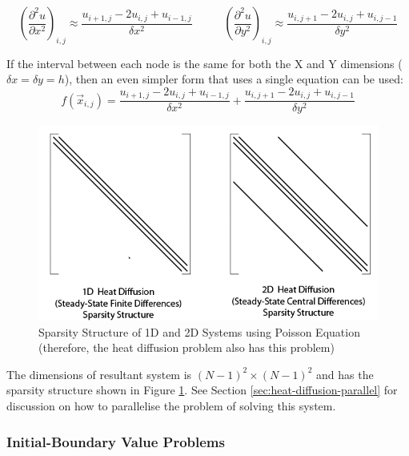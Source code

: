 \documentclass{article}
\begin{document}
\begin{equation}
	{\left( \frac{\partial^2 u}{\partial x^2} \right)}_{i,j} \approx \frac{u_{i + 1,j} - 2u_{i,j} + u_{i - 1,j} }{\delta x^2}
	\;\;\;\;\;\;\;\;\;\;
	{\left( \frac{\partial^2 u}{\partial y^2} \right)}_{i,j} \approx \frac{u_{i,j+1} - 2u_{i,j} + u_{i,j-1} }{\delta y^2}
	\label{eq:poisson-2d-approx}
\end{equation}

If the interval between each node is the same for both the X and Y dimensions ($\delta x = \delta y = h$), then an even simpler form that uses a single equation can be used:
\begin{equation}
	f(\vec{x}_{i,j}) = \frac{u_{i + 1,j} - 2u_{i,j} + u_{i - 1,j} }{\delta x^2} + \frac{u_{i,j+1} - 2u_{i,j} + u_{i,j-1} }{\delta y^2}
	\label{eq:poisson-2d-approx-uniform}
\end{equation}

\begin{figure}
	\centering
	\includegraphics[scale=0.35]{figures/heat-diffusion-sparsity-structures.png}
	\caption{Sparsity Structure of 1D and 2D Systems using Poisson Equation (therefore, the heat diffusion problem also has this problem)}
	\label{fig:poisson-1d-and-2d-sparsity}
\end{figure}

The dimensions of resultant system is $(N - 1)^2 \times (N - 1)^2$ and has the sparsity structure shown in Figure \ref{fig:poisson-1d-and-2d-sparsity}. See Section \ref{sec:heat-diffusion-parallel} for discussion on how to parallelise the problem of solving this system.

\subsubsection{Initial-Boundary Value Problems}
\end{document}
